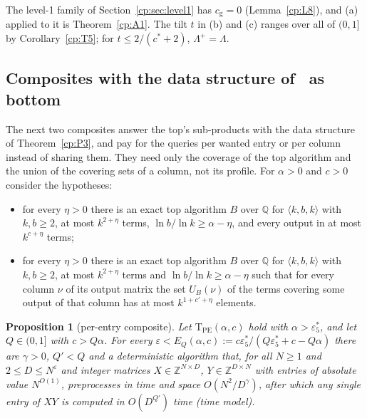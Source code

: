 \documentclass[11pt]{article}
\newtheorem{proposition}[theorem]{Proposition}
\theoremstyle{definition}
\theoremstyle{remark}
\providecommand{\eps}{\varepsilon}
\providecommand{\Z}{\mathbb{Z}}
\providecommand{\Q}{\mathbb{Q}}
\newcommand{\mat}[3]{\langle #1,#2,#3\rangle} %
\newcommand{\es}{\varepsilon^*_5}             %
\newcommand{\Lam}{\Lambda}                    %
\newcommand{\Lamp}{\Lambda^{+}}               %
\newcommand{\cg}{c_{\mathrm g}}               %
\newcommand{\cstar}{c^{*}}                    %
\newcommand{\TPE}{\mathrm{T}_{\mathrm{PE}}}   %
\newcommand{\Tcol}{\mathrm{T}_{\mathrm{col}}} %
\begin{document}
The level-1 family of Section~\ref{cp:sec:level1} has $\cg=0$ (Lemma~\ref{cp:L8}), and (a) applied to it is Theorem~\ref{cp:A1}. The tilt $t$ in (b) and (c) ranges over all of $(0,1]$ by Corollary~\ref{cp:T5}; for $t\le2/(\cstar+2)$, $\Lamp=\Lam$.

\subsection{Composites with the data structure of~\texorpdfstring{\cite{v2}}{[Maj26a]} as bottom}\label{cp:sec:PE}

The next two composites answer the top's sub-products with the data structure of Theorem~\ref{cp:P3}, and pay for the queries per wanted entry or per column instead of sharing them. They need only the coverage of the top algorithm and the union of the covering sets of a column, not its profile. For $\alpha>0$ and $c>0$ consider the hypotheses:
\begin{itemize}
\item[$\TPE(\alpha,c)$:] for every $\eta>0$ there is an exact top algorithm $B$ over $\Q$ for $\mat kbk$ with $k,b\ge2$, at most $k^{2+\eta}$ terms, $\ln b/\ln k\ge\alpha-\eta$, and every output in at most $k^{c+\eta}$ terms;
\item[$\Tcol(\alpha,c')$:] for every $\eta>0$ there is an exact top algorithm $B$ over $\Q$ for $\mat kbk$ with $k,b\ge2$, at most $k^{2+\eta}$ terms and $\ln b/\ln k\ge\alpha-\eta$ such that for every column $\nu$ of its output matrix the set $U_B(\nu)$ of the terms covering some output of that column has at most $k^{1+c'+\eta}$ elements.
\end{itemize}

\begin{proposition}[per-entry composite]\label{cp:T8}
Let $\TPE(\alpha,c)$ hold with $\alpha>\es$, and let $Q\in(0,1]$ with $c>Q\alpha$. For every $\eps<E_Q(\alpha,c):=c\es/(Q\es+c-Q\alpha)$ there are $\gamma>0$, $Q'<Q$ and a deterministic algorithm that, for all $N\ge1$ and $2\le D\le N^\eps$ and integer matrices $X\in\Z^{N\times D}$, $Y\in\Z^{D\times N}$ with entries of absolute value $N^{O(1)}$, preprocesses in time and space $O(N^2/D^\gamma)$, after which any single entry of $XY$ is computed in $O(D^{Q'})$ time (time model).
\end{proposition}
\end{document}
